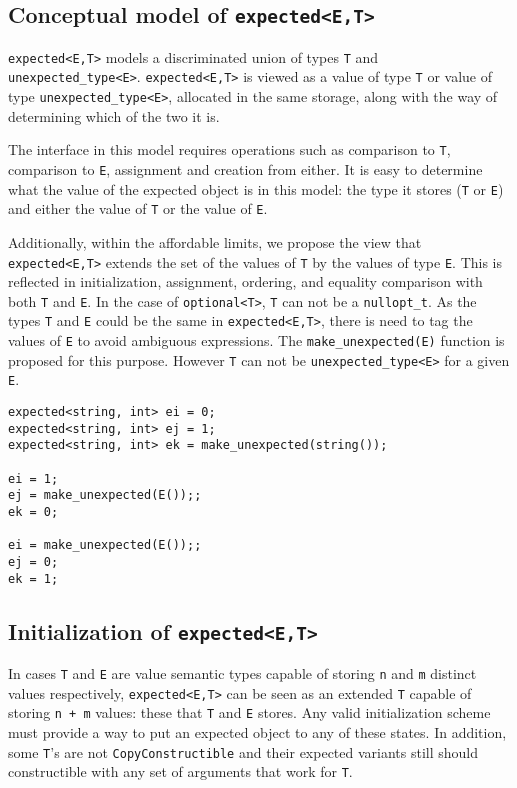 \documentclass[a4paper,10pt]{article}
\newcommand{\cpp}[1]{\lstinline{#1}}
\begin{document}
\subsection{Conceptual model of \cpp{expected<E,T>}}

\cpp{expected<E,T>} models a discriminated union of types \cpp{T} and \cpp{unexpected_type<E>}. \cpp{expected<E,T>} is viewed as a value of type \cpp{T} or value of type \cpp{unexpected_type<E>}, allocated in the same storage, along with the way of determining which of the two it is. 

The interface in this model requires operations such as comparison to \cpp{T}, comparison to \cpp{E}, assignment and creation from either. It is easy to determine what the value of the expected object is in this model: the type it stores (\cpp{T} or \cpp{E}) and either the value of \cpp{T} or the value of \cpp{E}. 

Additionally, within the affordable limits, we propose the view that \cpp{expected<E,T>} extends the set of the values of \cpp{T} by the values of type \cpp{E}. This is reflected in initialization, assignment, ordering, and equality comparison with both \cpp{T} and \cpp{E}. In the case of  \cpp{optional<T>}, \cpp{T} can not be a \cpp{nullopt_t}. As the types \cpp{T} and \cpp{E} could be the same in \cpp{expected<E,T>}, there is need to tag the values of \cpp{E} to avoid ambiguous expressions. The \cpp{make_unexpected(E)} function is proposed for this purpose. However \cpp{T} can not be  \cpp{unexpected_type<E>} for a given \cpp{E}.

\begin{lstlisting}
expected<string, int> ei = 0;
expected<string, int> ej = 1;
expected<string, int> ek = make_unexpected(string());

ei = 1;
ej = make_unexpected(E());;
ek = 0;

ei = make_unexpected(E());;
ej = 0;
ek = 1;
\end{lstlisting}

\subsection{Initialization of \cpp{expected<E,T>}}

In cases \cpp{T} and \cpp{E} are value semantic types capable of storing \cpp{n} and \cpp{m} distinct values respectively, \cpp{expected<E,T>} can be seen as an extended \cpp{T} capable of storing \cpp{n + m} values: these that \cpp{T} and \cpp{E} stores. Any valid initialization scheme must provide a way to put an expected object to any of these states. In addition, some \cpp{T}'s  are not \cpp{CopyConstructible} and their expected variants still should constructible with any set of arguments that work for \cpp{T}. 
\end{document}
